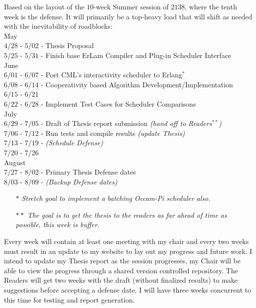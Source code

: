 Based on the layout of the $10$-week Summer session of $2138$, where the tenth week
is the defense. It will primarily be a top-heavy load that will shift as needed
with the inevitability of roadblocks:\\

    May\\
    	$4/28$ - $5/02$ - Thesis Proposal\\
        $5/25$ - $5/31$ - Finish base ErLam Compiler and Plug-in Scheduler Interface \\

    June \\
        $6/01$ - $6/07$ - Port CML's interactivity scheduler to Erlang$^*$\\
        $6/08$ - $6/14$ - Cooperativity based Algorithm Development/Implementation \\
        $6/15$ - $6/21$ \\
        $6/22$ - $6/28$ - Implement Test Cases for Scheduler Comparisons\\

    July\\
        $6/29$ - $7/05$ - Draft of Thesis report submission {\em (hand off to Readers$^{**}$)} \\
        $7/06$ - $7/12$ - Run tests and compile results {\em (update Thesis)} \\
        $7/13$ - $7/19$ - {\em(Schedule Defense)}\\
        $7/20$ - $7/26$ \\

    August\\
        $7/27$ - $8/02$ - Primary Thesis Defense dates\\
        $8/03$ - $8/09$ - {\em(Backup Defense dates)}

\begin{itemize}
\setlength{\itemsep}{1pt}
\setlength{\parskip}{0pt}
\setlength{\parsep}{0pt}
\item[$*$]{\small\em Stretch goal to implement a batching Occam-Pi scheduler also.}
\item[$**$]{\small\em The goal is to get the thesis to the readers as far ahead of time as possible, this week is buffer.}
\end{itemize}

Every week will contain at least one meeting with my chair and every two weeks
must result in an update to my website to lay out my progress and future work. 
I intend to update my Thesis report as the session progresses, my Chair will be 
able to view the progress through a shared version controlled repository. The
Readers will get two weeks with the draft (without finalized results) to make
suggestions before accepting a defense date. I will have three weeks concurrent
to this time for testing and report generation.

